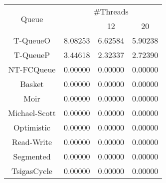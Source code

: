 \begin{tabular}{|c|c|c|c|}
\hline
\multirow{2}{*}{Queue} & \multicolumn{3}{c|}{\#Threads}\\\cline{2-4}& \quad 4 & 12 & 20\\
\hline
\hline
T-QueueO & 8.08253 & 6.62584 & 5.90238\\
T-QueueP & 3.44618 & 2.32337 & 2.72390\\
NT-FCQueue & 0.00000 & 0.00000 & 0.00000\\
Basket & 0.00000 & 0.00000 & 0.00000\\
Moir & 0.00000 & 0.00000 & 0.00000\\
Michael-Scott & 0.00000 & 0.00000 & 0.00000\\
Optimistic & 0.00000 & 0.00000 & 0.00000\\
Read-Write & 0.00000 & 0.00000 & 0.00000\\
Segmented & 0.00000 & 0.00000 & 0.00000\\
TsigasCycle & 0.00000 & 0.00000 & 0.00000\\
\hline\end{tabular}
